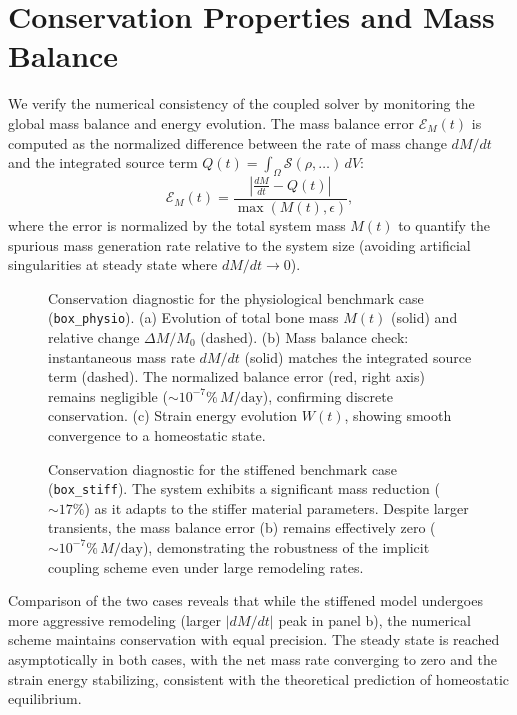\section{Conservation Properties and Mass Balance}
\label{sec:conservation-diagnostic}

We verify the numerical consistency of the coupled solver by monitoring the global mass balance and energy evolution.
The mass balance error $\mathcal{E}_M(t)$ is computed as the normalized difference between the rate of mass change $dM/dt$ and the integrated source term $Q(t) = \int_\Omega \mathcal{S}(\rho, \dots)\,dV$:
\begin{equation}
    \mathcal{E}_M(t) = \frac{\left| \frac{dM}{dt} - Q(t) \right|}{\max(M(t), \epsilon)},
\end{equation}
where the error is normalized by the total system mass $M(t)$ to quantify the spurious mass generation rate relative to the system size (avoiding artificial singularities at steady state where $dM/dt \to 0$).

\begin{figure}[htbp]
    \centering
    \caption{Conservation diagnostic for the physiological benchmark case (\texttt{box\_physio}).
    (a) Evolution of total bone mass $M(t)$ (solid) and relative change $\Delta M/M_0$ (dashed).
    (b) Mass balance check: instantaneous mass rate $dM/dt$ (solid) matches the integrated source term (dashed). The normalized balance error (red, right axis) remains negligible ($\sim 10^{-7}\%\,M/\text{day}$), confirming discrete conservation.
    (c) Strain energy evolution $W(t)$, showing smooth convergence to a homeostatic state.}
    \label{fig:conservation-physio}
\end{figure}

\begin{figure}[htbp]
    \centering
    \caption{Conservation diagnostic for the stiffened benchmark case (\texttt{box\_stiff}).
    The system exhibits a significant mass reduction ($\sim 17\%$) as it adapts to the stiffer material parameters.
    Despite larger transients, the mass balance error (b) remains effectively zero ($\sim 10^{-7}\%\,M/\text{day}$), demonstrating the robustness of the implicit coupling scheme even under large remodeling rates.}
    \label{fig:conservation-stiff}
\end{figure}

Comparison of the two cases reveals that while the stiffened model undergoes more aggressive remodeling (larger $|dM/dt|$ peak in panel b), the numerical scheme maintains conservation with equal precision. The steady state is reached asymptotically in both cases, with the net mass rate converging to zero and the strain energy stabilizing, consistent with the theoretical prediction of homeostatic equilibrium.
